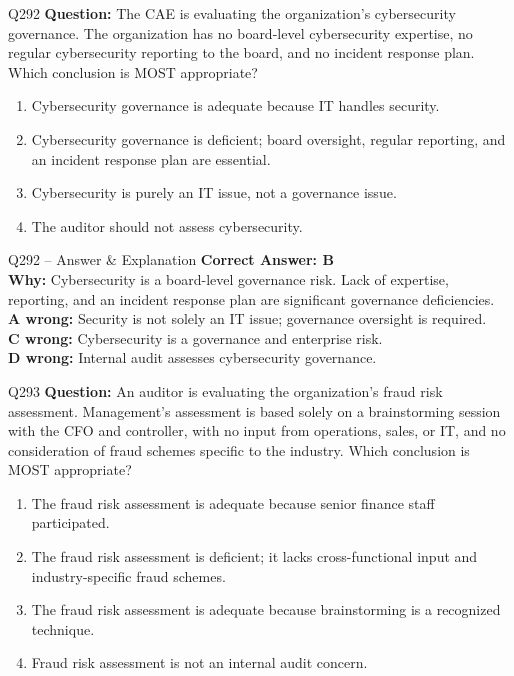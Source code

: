 \documentclass[aspectratio=169,10pt]{beamer}
\begin{document}
	\begin{frame}[t]{Q292}
		\small
		\textbf{Question:} The CAE is evaluating the organization's cybersecurity governance. The organization has no board-level cybersecurity expertise, no regular cybersecurity reporting to the board, and no incident response plan. Which conclusion is MOST appropriate?
		\begin{enumerate}[label=\Alph*.,itemsep=1pt,topsep=2pt]
			\item Cybersecurity governance is adequate because IT handles security.
			\item Cybersecurity governance is deficient; board oversight, regular reporting, and an incident response plan are essential.
			\item Cybersecurity is purely an IT issue, not a governance issue.
			\item The auditor should not assess cybersecurity.
		\end{enumerate}
	\end{frame}
	
	\begin{frame}[t]{Q292 -- Answer \& Explanation}
		\small
		\textbf{Correct Answer: B} \\[4pt]
		\textbf{Why:} Cybersecurity is a board-level governance risk. Lack of expertise, reporting, and an incident response plan are significant governance deficiencies. \\[4pt]
		\textbf{A wrong:} Security is not solely an IT issue; governance oversight is required. \\[2pt]
		\textbf{C wrong:} Cybersecurity is a governance and enterprise risk. \\[2pt]
		\textbf{D wrong:} Internal audit assesses cybersecurity governance.
	\end{frame}
	
	\begin{frame}[t]{Q293}
		\small
		\textbf{Question:} An auditor is evaluating the organization's fraud risk assessment. Management's assessment is based solely on a brainstorming session with the CFO and controller, with no input from operations, sales, or IT, and no consideration of fraud schemes specific to the industry. Which conclusion is MOST appropriate?
		\begin{enumerate}[label=\Alph*.,itemsep=1pt,topsep=2pt]
			\item The fraud risk assessment is adequate because senior finance staff participated.
			\item The fraud risk assessment is deficient; it lacks cross-functional input and industry-specific fraud schemes.
			\item The fraud risk assessment is adequate because brainstorming is a recognized technique.
			\item Fraud risk assessment is not an internal audit concern.
		\end{enumerate}
	\end{frame}
	
\end{document}
